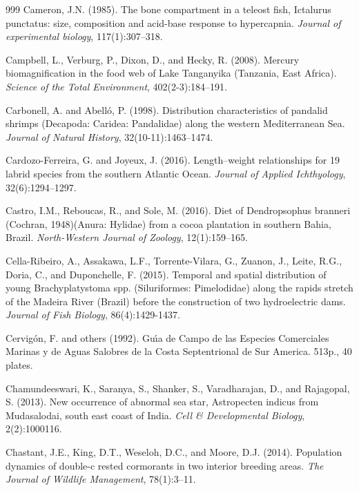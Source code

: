 \begin{thebibliography}{999}
Cameron, J.N. (1985). The bone compartment in a teleost fish, Ictalurus punctatus: size, composition and acid-base response to hypercapnia. \textit{Journal of experimental biology}, 117(1):307--318.

Campbell, L., Verburg, P., Dixon, D., and Hecky, R. (2008). Mercury biomagnification in the food web of Lake Tanganyika (Tanzania, East Africa). \textit{Science of the Total Environment}, 402(2-3):184--191.

Carbonell, A. and Abell{\'o}, P. (1998). Distribution characteristics of pandalid shrimps (Decapoda: Caridea: Pandalidae) along the western Mediterranean Sea. \textit{Journal of Natural History}, 32(10-11):1463--1474.

Cardozo-Ferreira, G. and Joyeux, J. (2016). Length--weight relationships for 19 labrid species from the southern Atlantic Ocean. \textit{Journal of Applied Ichthyology}, 32(6):1294--1297.

Castro, I.M., Reboucas, R., and Sole, M. (2016). Diet of Dendropsophus branneri (Cochran, 1948)(Anura: Hylidae) from a cocoa plantation in southern Bahia, Brazil. \textit{North-Western Journal of Zoology}, 12(1):159--165.

Cella-Ribeiro, A., Assakawa, L.F., Torrente-Vilara, G., Zuanon, J., Leite, R.G., Doria, C., and Duponchelle, F. (2015). Temporal and spatial distribution of young Brachyplatystoma spp. (Siluriformes: Pimelodidae) along the rapids stretch of the Madeira River (Brazil) before the construction of two hydroelectric dams. \textit{Journal of Fish Biology}, 86(4):1429-1437.

Cervig{\'o}n, F. and others (1992). Gu{\'\i}a de Campo de las Especies Comerciales Marinas y de Aguas Salobres de la Costa Septentrional de Sur America. 513p., 40 plates.

Chamundeeswari, K., Saranya, S., Shanker, S., Varadharajan, D., and Rajagopal, S. (2013). New occurrence of abnormal sea star, Astropecten indicus from Mudasalodai, south east coast of India. \textit{Cell \& Developmental Biology}, 2(2):1000116.

Chastant, J.E., King, D.T., Weseloh, D.C., and Moore, D.J. (2014). Population dynamics of double-c rested cormorants in two interior breeding areas. \textit{The Journal of Wildlife Management}, 78(1):3--11.


\end{thebibliography}
